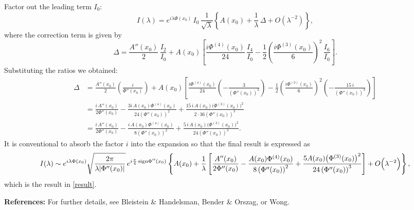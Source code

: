 \documentclass[11pt]{article}
\begin{document}
Factor out the leading term $I_0$:
\[
I(\lambda)=e^{i\lambda\Phi(x_0)}\,I_0\,\frac{1}{\sqrt{\lambda}}\left\{ A(x_0) + \frac{1}{\lambda}\,\Delta + O\left(\lambda^{-2}\right) \right\},
\]
where the correction term is given by
\[
\Delta = \frac{A''(x_0)}{2}\,\frac{I_2}{I_0} + A(x_0)\left[\frac{i\Phi^{(4)}(x_0)}{24}\,\frac{I_4}{I_0} -\frac{1}{2}\left(\frac{i\Phi^{(3)}(x_0)}{6}\right)^2\,\frac{I_6}{I_0}\right].
\]
Substituting the ratios we obtained:
\[
\begin{aligned}
\Delta &= \frac{A''(x_0)}{2}\left(\frac{i}{\Phi''(x_0)}\right)
+ A(x_0)\left[\frac{i\Phi^{(4)}(x_0)}{24}\left(-\frac{3}{\left(\Phi''(x_0)\right)^2}\right)-\frac{1}{2}\left(\frac{i\Phi^{(3)}(x_0)}{6}\right)^2\left(-\frac{15\,i}{\left(\Phi''(x_0)\right)^3}\right)\right]\\[1mm]
&=\frac{i\,A''(x_0)}{2\Phi''(x_0)}
-\frac{3i\,A(x_0)\Phi^{(4)}(x_0)}{24\left(\Phi''(x_0)\right)^2}
+\frac{15\,i\,A(x_0)\bigl(\Phi^{(3)}(x_0)\bigr)^2}{2\cdot 36\left(\Phi''(x_0)\right)^3}\\[1mm]
&=\frac{i\,A''(x_0)}{2\Phi''(x_0)}
-\frac{i\,A(x_0)\Phi^{(4)}(x_0)}{8\left(\Phi''(x_0)\right)^2}
+\frac{5\,i\,A(x_0)\bigl(\Phi^{(3)}(x_0)\bigr)^2}{24\left(\Phi''(x_0)\right)^3}.
\end{aligned}
\]
It is conventional to absorb the factor $i$ into the expansion so that the final result is expressed as
\[
I(\lambda)\sim e^{i\lambda\Phi(x_0)}\sqrt{\frac{2\pi}{\lambda|\Phi''(x_0)|}}\,e^{i\frac{\pi}{4}\,\text{sign}\Phi''(x_0)}
\left\{ A(x_0) + \frac{1}{\lambda}\left[\frac{A''(x_0)}{2\Phi''(x_0)}
-\frac{A(x_0)\Phi^{(4)}(x_0)}{8\left(\Phi''(x_0)\right)^2}+\frac{5A(x_0)\bigl(\Phi^{(3)}(x_0)\bigr)^2}{24\left(\Phi''(x_0)\right)^3}\right] + O\Bigl(\lambda^{-2}\Bigr) \right\},
\]
which is the result in \eqref{result}.

\bigskip

\noindent \textbf{References:} For further details, see Bleistein \& Handelsman, Bender \& Orszag, or Wong.
\end{document}
